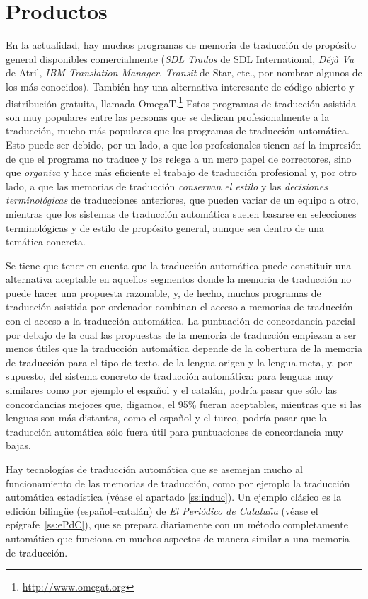 \section{Productos} 

En la actualidad, hay muchos programas de memoria de traducción de propósito general disponibles comercialmente (\emph{SDL Trados} de SDL International, \emph{Déjà Vu} de Atril, \emph{IBM Translation Manager}, \emph{Transit} de Star, etc., por nombrar algunos de los más conocidos). También hay una alternativa interesante de código abierto y distribución gratuita, llamada OmegaT.\footnote{\url{http://www.omegat.org}} Estos programas de traducción asistida son muy populares entre las personas que se dedican profesionalmente a la traducción, mucho más populares que los programas de traducción automática. Esto puede ser debido, por un lado, a que los profesionales tienen así la impresión de que el programa no traduce y los relega a un mero papel de correctores, sino que \emph{organiza} y hace más eficiente el trabajo de traducción profesional y, por otro lado, a que las memorias de traducción \emph{conservan el estilo} y las \emph{decisiones terminológicas} de traducciones anteriores, que pueden variar de un equipo a otro, mientras que los sistemas de traducción automática suelen basarse en selecciones terminológicas y de estilo de propósito general, aunque sea dentro de una temática concreta. 

Se tiene que tener en cuenta que la traducción automática puede constituir una alternativa aceptable en aquellos segmentos donde la memoria de traducción no puede hacer una propuesta razonable, y, de hecho, muchos programas de traducción asistida por ordenador combinan el acceso a memorias de traducción con el acceso a la traducción automática. La puntuación de concordancia parcial por debajo de la cual las propuestas de la memoria de traducción empiezan a ser menos útiles que la traducción automática depende de la cobertura de la memoria de traducción para el tipo de texto, de la lengua origen y la lengua meta, y, por supuesto, del sistema concreto de traducción automática: para lenguas muy similares como por ejemplo el español y el catalán, podría pasar que sólo las concordancias mejores que, digamos, el 95\% fueran aceptables, mientras que si las lenguas son más distantes, como el español y el turco, podría pasar que la traducción automática sólo fuera útil para puntuaciones de concordancia muy bajas. 

Hay tecnologías de traducción automática que se asemejan mucho al funcionamiento de las memorias de traducción, como por ejemplo la traducción automática estadística (véase el apartado \ref{ss:induc}). Un ejemplo clásico es la edición bilingüe (español--catalán) de \emph{El Periódico de Cataluña} (véase el epígrafe~\ref{ss:ePdC}), que se prepara diariamente con un método completamente automático que funciona en muchos aspectos de manera similar a una memoria de traducción. 

